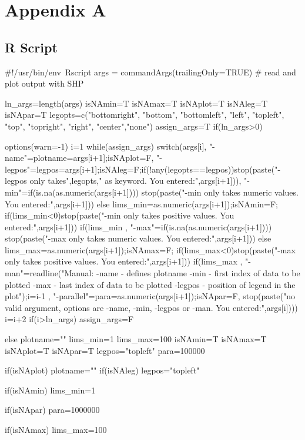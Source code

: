 \chapter{Appendix A}
\section{R Script}

\#!/usr/bin/env\ Rscript
args = commandArgs(trailingOnly=TRUE)
\# read and plot output with SHP

ln\_args=length(args)
isNAmin=T
isNAmax=T
isNAplot=T
isNAleg=T
isNApar=T
legopts=c("bottomright", "bottom", "bottomleft", 
"left", "topleft", "top", "topright", "right", "center","none")
assign\_args=T
if(ln\_args>0){
	options(warn=-1)
	i=1
	while(assign\_args){
		switch(args[i],
		"-name"={plotname=args[i+1];isNAplot=F},
		"-legpos"={legpos=args[i+1];isNAleg=F;if(!any(legopts==legpos)){stop(paste("-legpos only takes",legopts," as keyword. You entered:",args[i+1]))}},
		"-min"={if(is.na(as.numeric(args[i+1])))
			{stop(paste("-min only takes numeric values. You entered:",args[i+1]))}
			else
			{lims\_min=as.numeric(args[i+1]);isNAmin=F};
			if(lims\_min<0){stop(paste("-min only takes positive values. You entered:",args[i+1]))}
			if(lims\_min%
		},
		"-max"={if(is.na(as.numeric(args[i+1])))
			{stop(paste("-max only takes numeric values. You entered:",args[i+1]))}
			else
			{lims\_max=as.numeric(args[i+1]);isNAmax=F};
			if(lims\_max<0){stop(paste("-max only takes positive values. You entered:",args[i+1]))}
			if(lims\_max%
		},
		"-man"={readline("Manual:      -name - defines plotname 
			-min - first index of data to be plotted
			-max - last index of data to be plotted
			-legpos - position of legend in the plot");i=i-1
		},
		"-parallel"={para=as.numeric(args[i+1]);isNApar=F},
		stop(paste("no valid argument, options are -name, -min, -legpos or -man. You entered:",args[i])))
		i=i+2
		if(i>ln\_args){
			assign\_args=F
		}
	}
	
}else{
	plotname=""
	lims\_min=1
	lims\_max=100
	isNAmin=T
	isNAmax=T
	isNAplot=T
	isNApar=T
	legpos="topleft"
	para=100000
}

if(isNAplot){
	plotname=""
}
if(isNAleg){
	legpos="topleft"
}

if(isNAmin){
	lims\_min=1
}

if(isNApar){
	para=1000000
}


if(isNAmax){
	lims\_max=100
}

